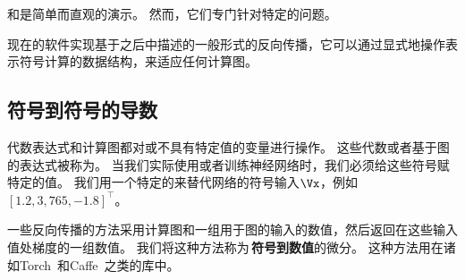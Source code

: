 和是简单而直观的演示。
然而，它们专门针对特定的问题。

现在的软件实现基于之后中描述的一般形式的反向传播，它可以通过显式地操作表示符号计算的数据结构，来适应任何计算图。



\subsection{符号到符号的导数}
\label{sec:symbol_to_symbol_derivatives}

代数表达式和计算图都对或不具有特定值的变量进行操作。
这些代数或者基于图的表达式被称为。
当我们实际使用或者训练神经网络时，我们必须给这些符号赋特定的值。
我们用一个特定的来替代网络的符号输入$\Vx$，例如$[1.2, 3,765, -1.8]^\top$。

一些反向传播的方法采用计算图和一组用于图的输入的数值，然后返回在这些输入值处梯度的一组数值。
我们将这种方法称为\,\textbf{符号到数值}的微分。
这种方法用在诸如Torch~\citep{Collobert-et-al-2011b}和Caffe~\citep{Jia-2013}之类的库中。

 
